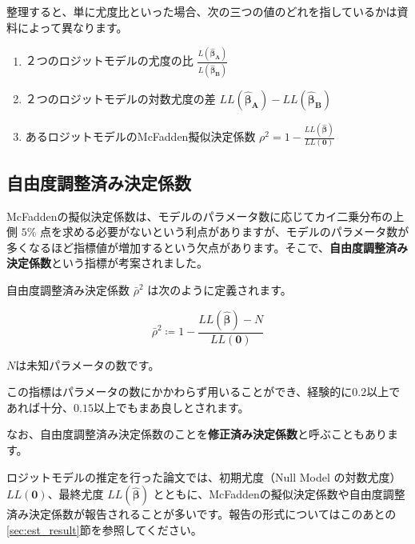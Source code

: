 整理すると、単に尤度比といった場合、次の三つの値のどれを指しているかは資料によって異なります。

\begin{enumerate}
    \item ２つのロジットモデルの尤度の比 $\frac{L(\bm{\hat\beta_A})}{L(\bm{\hat\beta_B})}$
    \item ２つのロジットモデルの対数尤度の差 $LL(\bm{\hat\beta_A})-LL(\bm{\hat\beta_B})$
    \item あるロジットモデルのMcFadden擬似決定係数 $\rho^2=1-\frac{LL(\bm{\hat\beta})}{LL(\bm 0)}$
\end{enumerate}

\subsection{自由度調整済み決定係数}

McFaddenの擬似決定係数は、モデルのパラメータ数に応じてカイ二乗分布の上側 $5\%$ 点を求める必要がないという利点がありますが、モデルのパラメータ数が多くなるほど指標値が増加するという欠点があります。そこで、\textbf{自由度調整済み決定係数}という指標が考案されました。

自由度調整済み決定係数 $\bar\rho^2$ は次のように定義されます。

\begin{equation}
    \bar\rho^2 \coloneq 1-\frac{LL(\bm{\hat\beta})-N}{LL(\bm 0)}
\end{equation}

$N$は未知パラメータの数です。

この指標はパラメータの数にかかわらず用いることができ、経験的に$0.2$以上であれば十分、$0.15$以上でもまあ良しとされます。

なお、自由度調整済み決定係数のことを\textbf{修正済み決定係数}と呼ぶこともあります。

ロジットモデルの推定を行った論文では、初期尤度（Null Model の対数尤度）$LL(\bm 0)$、最終尤度 $LL(\bm{\hat\beta})$ とともに、McFaddenの擬似決定係数や自由度調整済み決定係数が報告されることが多いです。報告の形式についてはこのあとの\ref{sec:est_result}節を参照してください。
